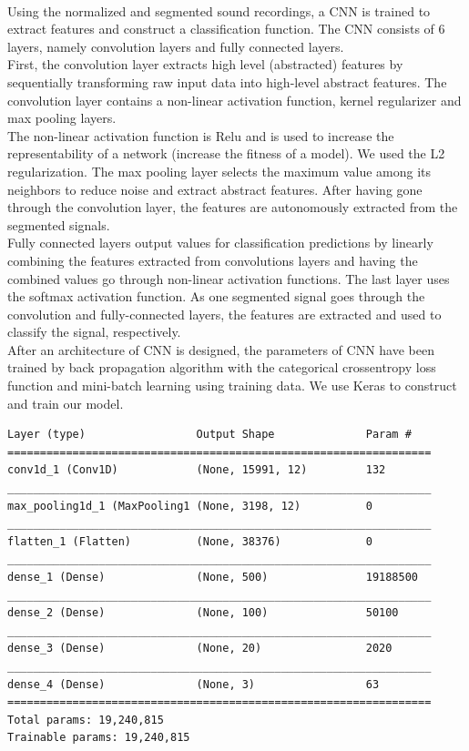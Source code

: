 \documentclass[11pt, a4papper]{report}
\theoremstyle{plain}
\theoremstyle{definition}
\theoremstyle{definition}
\theoremstyle{proposition}
\begin{document}
\

Using the normalized and segmented sound recordings, a CNN is trained to extract features and construct a classification function. The CNN consists of 6 layers, namely convolution layers and fully connected layers. \cite{18}
\\

First, the convolution layer extracts high level (abstracted) features by sequentially transforming raw input data into high-level abstract features. The convolution layer contains a non-linear activation function, kernel regularizer and max pooling layers. 
\\

The non-linear activation function is Relu and is used to increase the representability of a network (increase the fitness of a model). We used the L2 regularization. The max pooling layer selects the maximum value among its neighbors to reduce noise and extract abstract features. After having gone through the convolution layer, the features are autonomously extracted from the segmented signals.
\\

Fully connected layers output values for classification predictions by linearly combining the features extracted from convolutions layers and having the combined values go through non-linear activation functions. The last layer uses the softmax activation function. As one segmented signal goes through the convolution and fully-connected layers, the features are extracted and used to classify the signal, respectively.
\\

After an architecture of CNN is designed, the parameters of CNN have been trained by back propagation algorithm with the categorical crossentropy loss function and mini-batch learning using training data. We use Keras to construct and train our model.
\\

\begin{verbatim}
Layer (type)                 Output Shape              Param #   
=================================================================
conv1d_1 (Conv1D)            (None, 15991, 12)         132       
_________________________________________________________________
max_pooling1d_1 (MaxPooling1 (None, 3198, 12)          0         
_________________________________________________________________
flatten_1 (Flatten)          (None, 38376)             0         
_________________________________________________________________
dense_1 (Dense)              (None, 500)               19188500  
_________________________________________________________________
dense_2 (Dense)              (None, 100)               50100     
_________________________________________________________________
dense_3 (Dense)              (None, 20)                2020      
_________________________________________________________________
dense_4 (Dense)              (None, 3)                 63        
=================================================================
Total params: 19,240,815
Trainable params: 19,240,815
\end{verbatim}
\end{document}
